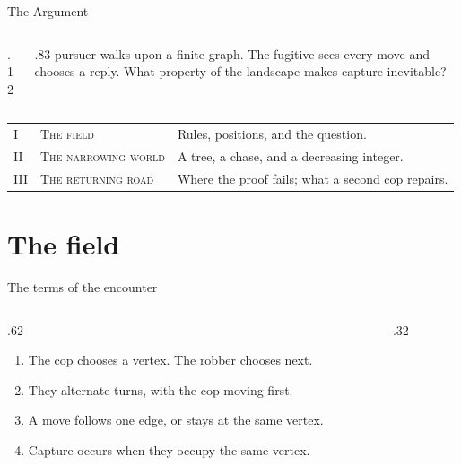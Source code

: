 \documentclass[aspectratio=169,11pt]{beamer}
\begin{document}
\begin{frame}{The Argument}
  \begin{columns}[T,onlytextwidth]
    \begin{column}{.12\textwidth}\end{column}
    \begin{column}{.83\textwidth}
      \large pursuer walks upon a finite graph. The fugitive sees every
      move and chooses a reply. What property of the landscape makes
      capture inevitable?
    \end{column}
  \end{columns}
  \medskip
  \begin{tabular}{@{}p{10mm}>{\raggedright\arraybackslash}p{35mm}>{\raggedright\arraybackslash}p{74mm}@{}}
    \toprule
    \textcolor{AtlasRubric}{I} & \textsc{The field} & Rules, positions, and the question.\\[2mm]
    \textcolor{AtlasRubric}{II} & \textsc{The narrowing world} & A tree, a chase, and a decreasing integer.\\[2mm]
    \textcolor{AtlasRubric}{III} & \textsc{The returning road} & Where the proof fails; what a second cop repairs.\\
    \bottomrule
  \end{tabular}
  \medskip
  \centerline{\AtlasGrandFleuron[25mm]}
\end{frame}

\section{The field}

\begin{frame}{The terms of the encounter}
  \begin{columns}[T,onlytextwidth]
    \begin{column}{.62\textwidth}
      \begin{enumerate}[<+->]
        \item The cop chooses a vertex. The robber chooses next.
        \medskip
        \item They alternate turns, with the cop moving first.
        \medskip
        \item A move follows one edge, or stays at the same vertex.
        \medskip
        \item Capture occurs when they occupy the same vertex.
      \end{enumerate}
    \end{column}
    \begin{column}{.32\textwidth}
      \centering\medskip\AtlasGrandFleuron[20mm]
    \end{column}
  \end{columns}
\end{frame}
\end{document}
